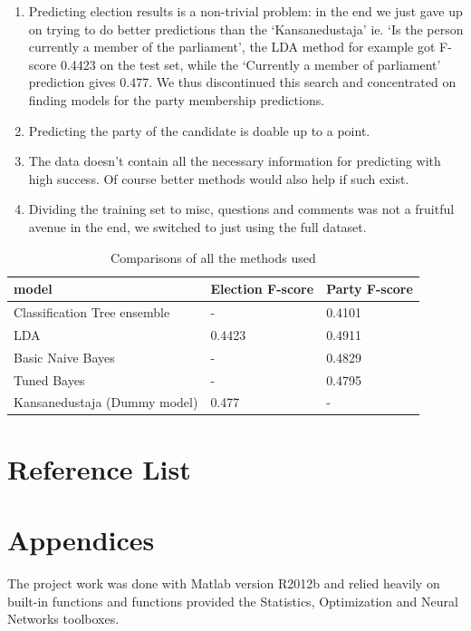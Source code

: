 \documentclass[a4paper,10pt]{article}
\begin{document}
\begin{enumerate}
\item  Predicting election results is a non-trivial problem: in the end we just gave up on trying to do better predictions than the ‘Kansanedustaja’ ie. ‘Is the person currently a member of the parliament’, the LDA method for example got F-score 0.4423 on the test set, while the ‘Currently a member of parliament’ prediction gives 0.477. We thus discontinued this search and concentrated on finding models for the party membership predictions.


\item  Predicting the party of the candidate is doable up to a point.


\item  The data doesn’t contain all the necessary information for predicting with high success. Of course better methods would also help if such exist.

\item Dividing the training set to misc, questions and comments was not a fruitful avenue in the end, we switched to just using the full dataset.
\end{enumerate}

\begin{table}
	\caption{Comparisons of all the methods used}
    \begin{tabular}{|l|l|l|}
    \hline
    model                        & Election F-score & Party F-score \\ \hline
    Classification Tree ensemble & -                & 0.4101        \\ \hline
    LDA                          & 0.4423           & 0.4911        \\ \hline
    Basic Naive Bayes            & -                & 0.4829        \\ \hline
    Tuned Bayes                  & -                & 0.4795        \\ \hline
    Kansanedustaja (Dummy model) & 0.477            & -             \\ \hline
    \end{tabular}
    \label{AllMethods}
\end{table}

\section{Reference List}



\section{Appendices}

The project work was done with Matlab version R2012b and relied heavily on built-in functions and functions provided the Statistics, Optimization and Neural Networks toolboxes.
\end{document}
